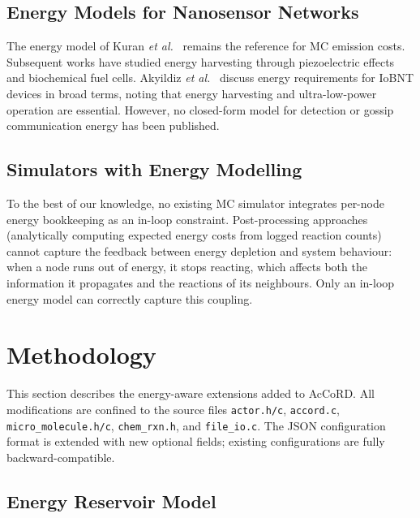 \documentclass[journal]{IEEEtran}
\begin{document}
\subsection{Energy Models for Nanosensor Networks}

The energy model of Kuran \emph{et al.}~\cite{kuran2010energy} remains the
reference for MC emission costs. Subsequent works have studied energy
harvesting through piezoelectric effects \cite{jornet2012nano} and biochemical
fuel cells. Akyildiz \emph{et al.}~\cite{akyildiz2015internet} discuss energy
requirements for IoBNT devices in broad terms, noting that energy harvesting and
ultra-low-power operation are essential. However, no closed-form model for
detection or gossip communication energy has been published.

\subsection{Simulators with Energy Modelling}

To the best of our knowledge, no existing MC simulator integrates per-node
energy bookkeeping as an in-loop constraint. Post-processing approaches
(analytically computing expected energy costs from logged reaction counts)
cannot capture the feedback between energy depletion and system behaviour:
when a node runs out of energy, it stops reacting, which affects both the
information it propagates and the reactions of its neighbours. Only an in-loop
energy model can correctly capture this coupling.

\section{Methodology}
\label{sec:methodology}

This section describes the energy-aware extensions added to AcCoRD. All
modifications are confined to the source files \texttt{actor.h/c},
\texttt{accord.c}, \texttt{micro\_molecule.h/c}, \texttt{chem\_rxn.h}, and
\texttt{file\_io.c}. The JSON configuration format is extended with new
optional fields; existing configurations are fully backward-compatible.

\subsection{Energy Reservoir Model}
\end{document}
